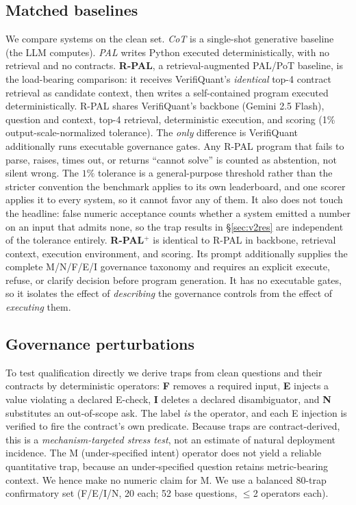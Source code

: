 \documentclass[sigconf,anonymous]{acmart}
\begin{document}
\subsection{Matched baselines}
We compare systems on the clean set.
\emph{CoT} is a single-shot generative baseline (the LLM computes).
\emph{PAL} writes Python executed deterministically, with no retrieval and no contracts.
\textbf{R-PAL}, a retrieval-augmented PAL/PoT baseline, is the load-bearing comparison: it receives VerifiQuant's \emph{identical} top-4 contract retrieval as candidate context, then writes a self-contained program executed deterministically.
R-PAL shares VerifiQuant's backbone (Gemini 2.5 Flash), question and context, top-4 retrieval, deterministic execution, and scoring (1\% output-scale-normalized tolerance). The \emph{only} difference is VerifiQuant additionally runs executable governance gates.
Any R-PAL program that fails to parse, raises, times out, or returns ``cannot solve'' is counted as abstention, not silent wrong.
The $1\%$ tolerance is a general-purpose threshold rather than the stricter convention the benchmark applies to its own leaderboard, and one scorer applies it to every system, so it cannot favor any of them. It also does not touch the headline: false numeric acceptance counts whether a system emitted a number on an input that admits none, so the trap results in \S\ref{sec:v2res} are independent of the tolerance entirely.
\textbf{R-PAL$^{+}$} is identical to R-PAL in backbone, retrieval context, execution environment, and scoring. Its prompt additionally supplies the complete M/N/F/E/I governance taxonomy and requires an explicit execute, refuse, or clarify decision before program generation. It has no executable gates, so it isolates the effect of \emph{describing} the governance controls from the effect of \emph{executing} them.

\subsection{Governance perturbations}
To test qualification directly we derive traps from clean questions and their contracts by deterministic operators: \textbf{F} removes a required input, \textbf{E} injects a value violating a declared E-check, \textbf{I} deletes a declared disambiguator, and \textbf{N} substitutes an out-of-scope ask.
The label \emph{is} the operator, and each E injection is verified to fire the contract's own predicate.
Because traps are contract-derived, this is a \emph{mechanism-targeted stress test}, not an estimate of natural deployment incidence.
The M (under-specified intent) operator does not yield a reliable quantitative trap, because an under-specified question retains metric-bearing context. We hence make no numeric claim for M.
We use a balanced 80-trap confirmatory set (F/E/I/N, 20 each; 52 base questions, $\le$2 operators each).
\end{document}

